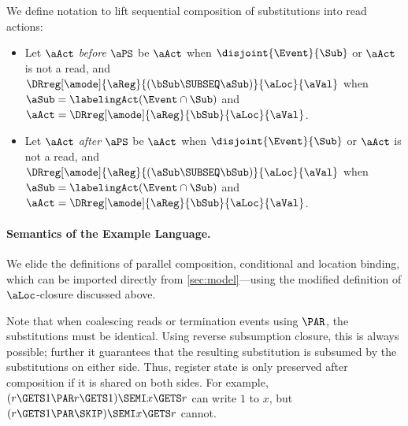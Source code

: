 We define notation to lift sequential composition of substitutions into
read actions:
\begin{itemize}
\item Let $\aAct$ \emph{before} $\aPS$ be $\aAct$ when
  $\disjoint{\Event}{\Sub}$ or $\aAct$ is not a read, and
  $\DRreg[\amode]{\aReg}{(\bSub\SUBSEQ\aSub)}{\aLoc}{\aVal}$ when
  $\aSub=\labelingAct(\Event\cap\Sub)$ and
  $\aAct=\DRreg[\amode]{\aReg}{\bSub}{\aLoc}{\aVal}$.
\item 
  Let $\aAct$ \emph{after} $\aPS$ be $\aAct$ when $\disjoint{\Event}{\Sub}$
  or $\aAct$ is not a read, and
  $\DRreg[\amode]{\aReg}{(\aSub\SUBSEQ\bSub)}{\aLoc}{\aVal}$ when
  $\aSub=\labelingAct(\Event\cap\Sub)$ and
  $\aAct=\DRreg[\amode]{\aReg}{\bSub}{\aLoc}{\aVal}$.
\end{itemize}

\paragraph{Semantics of the Example Language.}

We elide the definitions of parallel composition, conditional and location
binding, which can be imported directly from
\textsection\ref{sec:model}---using the modified definition of
$\aLoc$-closure discussed above.

Note that when coalescing reads or termination events using \!$\PAR$\!,
the substitutions must be identical.  Using reverse subsumption closure, this
is always possible; further it guarantees that the resulting substitution is subsumed by
the substitutions on either side.  Thus, register state is only preserved
after composition if it is shared on both sides.
For example,
\begin{math}
  (r\GETS 1\PAR r\GETS 1)\SEMI x\GETS r
\end{math}
can write $1$ to $x$, but
\begin{math}
  (r\GETS 1\PAR \SKIP)\SEMI x\GETS r
\end{math}
cannot.

